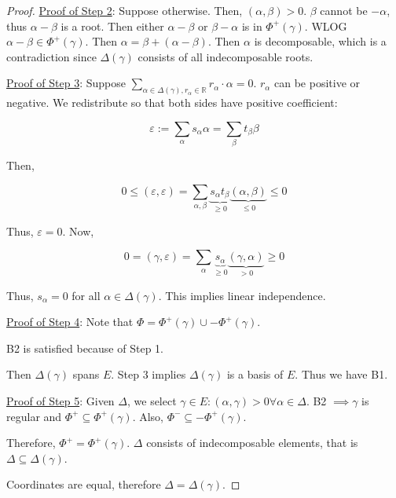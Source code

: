 \documentclass{article}
\theoremstyle{definition}
\begin{document}
\begin{proof}
    \underline{Proof of Step 2}: Suppose otherwise. Then, \((\alpha , \beta) > 0\). \(\beta\) cannot be \(-\alpha\), thus \(\alpha - \beta\) is a root. Then either \(\alpha - \beta\) or \(\beta - \alpha\) is in \(\Phi^+(\gamma)\). WLOG \(\alpha - \beta \in \Phi^+(\gamma)\). Then \(\alpha  = \beta + (\alpha - \beta)\). Then \(\alpha\) is decomposable, which is a contradiction since \(\Delta (\gamma)\) consists of all indecomposable roots.

    \underline{Proof of Step 3}: Suppose \(\sum_{\alpha \in \Delta (\gamma), r_\alpha \in \mathbb{R}} r_\alpha \cdot \alpha = 0\). \(r_\alpha\) can be positive or negative. We redistribute so that both sides have positive coefficient:

    \[
        \varepsilon := \sum_\alpha s_\alpha \alpha = \sum_\beta t_\beta \beta
    \]

    Then, 

    \[
        0 \leq (\varepsilon , \varepsilon) = \sum_{\alpha , \beta} \underbrace{s_\alpha t_\beta}_{\geq 0} \underbrace{(\alpha , \beta)}_{\leq 0} \leq 0 
    \]

    Thus, \(\varepsilon = 0\). Now,

    \[
        0 = (\gamma , \varepsilon) = \sum_{\alpha} \underbrace{s_\alpha}_{\geq 0} \underbrace{(\gamma,\alpha)}_{>0} \geq 0 
    \]

    Thus, \(s_\alpha = 0\) for all \(\alpha\in \Delta(\gamma)\). This implies linear independence.
    
    \underline{Proof of Step 4}: Note that \(\Phi = \Phi^+(\gamma) \cup - \Phi^+(\gamma)\). 

    B2 is satisfied because of Step 1.

    Then \(\Delta (\gamma)\) spans \(E\). Step 3 implies \(\Delta (\gamma)\) is a basis of \(E\). Thus we have B1.

    \underline{Proof of Step 5}: Given \(\Delta\), we select \(\gamma \in E : (\alpha , \gamma)> 0 \forall \alpha \in \Delta\). B2 \(\implies \gamma\) is regular and \(\Phi^+ \subseteq \Phi^+(\gamma)\). Also, \(\Phi^- \subseteq - \Phi^+(\gamma)\). 

    Therefore, \(\Phi^+ = \Phi^+(\gamma)\). \(\Delta\) consists of indecomposable elements, that is \(\Delta \subseteq \Delta (\gamma)\).

    Coordinates are equal, therefore \(\Delta = \Delta (\gamma)\).

\end{proof}
\end{document}
